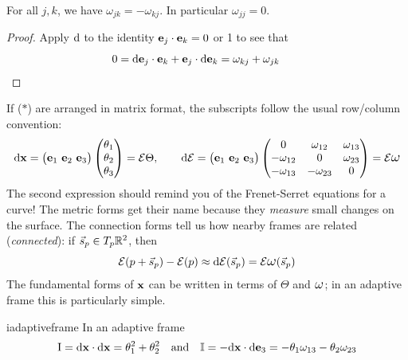 \begin{lemm}{}{}
For all $j,k$, we have $\omega_{jk}=-\omega_{kj}$. In particular $\omega_{jj}=0$.
\end{lemm}

\begin{proof}
Apply $\mathrm{d}$ to the identity ${\mathbf{e}}_j\cdot{\mathbf{e}}_k=0$ or 1 to see that
\[0=\mathrm{d}{\mathbf{e}}_j\cdot{\mathbf{e}}_k+{\mathbf{e}}_j\cdot\mathrm{d}{\mathbf{e}}_k=\omega_{kj}+\omega_{jk}\tag*{\qedhere}\]
\end{proof}

If ($\ast$) are arranged in matrix format, the subscripts follow the usual row/column convention:
\[\dvx=\bigl(\ve_1\ \ve_2\ \ve_3\bigr)\threevec{\theta_1}{\theta_2}{\theta_3}=\cE\Theta,\qquad \D \cE=\bigl(\ve_1\ \ve_2\ \ve_3\bigr)
	\begin{pmatrix}
		0&\omega_{12}&\omega_{13}\\
		-\omega_{12}&0&\omega_{23}\\
		-\omega_{13}&-\omega_{23}&0
	\end{pmatrix}
	=\cE\lomega\]
	The second expression should remind you of the Frenet-Serret equations for a curve! The metric forms get their name because they \emph{measure} small changes on the surface. The connection forms tell us how nearby frames are related (\emph{connected}): if $\vec s_p\in T_p\mathbb{R}^2$, then
\[\cE(p+\vec s_p)-\cE(p)\approx \D \cE(\vec s_p)=\cE\lomega(\vec s_p)\]
The fundamental forms of ${\mathbf{x}}$ can be written in terms of $\Theta$ and $\lomega$; in an adaptive frame this is particularly simple.

\begin{lemm}{}{iadaptiveframe}
In an adaptive frame
\[\mathrm{I}=\mathrm{d}{\mathbf{x}}\cdot\mathrm{d}{\mathbf{x}}=\theta_1^2+\theta_2^2\quad\text{and}\quad \mathbb{I}=-\mathrm{d}{\mathbf{x}}\cdot\mathrm{d}{\mathbf{e}}_3=-\theta_1\omega_{13}-\theta_2\omega_{23}\]
\end{lemm}

